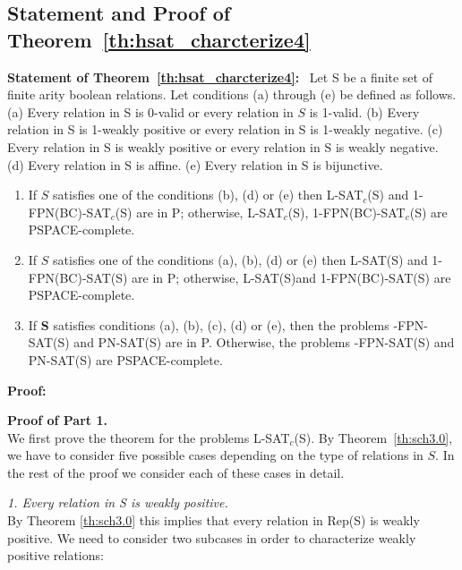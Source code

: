 \subsection{Statement and Proof of Theorem~\ref{th:hsat_charcterize4}}

\noindent
\textbf{Statement of Theorem~\ref{th:hsat_charcterize4}:}~
Let S be a finite set of finite arity boolean relations. Let conditions
(a) through (e) be defined as follows.
(a) Every relation in S is 0-valid or every relation in $S$ is 1-valid.
(b) Every relation in S is 1-weakly positive or
every relation in S is 1-weakly negative.
(c) Every relation in S is weakly positive or
every relation in S is weakly negative.
(d) Every relation in S is affine.
(e) Every relation in S is bijunctive.
\begin{enumerate}
\item
If $S$ satisfies one of the conditions (b), (d) or (e)
then L-SAT$_c$(S) and 1-FPN(BC)-SAT$_c$(S) are in P; otherwise,
L-SAT$_c$(S), 1-FPN(BC)-SAT$_c$(S) are  PSPACE-complete.

\item
If $S$ satisfies one of the conditions (a), (b), (d) or (e)
then L-SAT(S) and 1-FPN(BC)-SAT(S) are in P; otherwise, L-SAT(S)and 
1-FPN(BC)-SAT(S) are PSPACE-complete.

\item
If {\bf S} satisfies conditions (a), (b), (c), (d) or  (e), then the problems  
{-FPN-SAT(S)} and PN-SAT(S)  are in P. Otherwise, 
the problems  {-FPN-SAT(S)} and PN-SAT(S)  are  PSPACE-complete.
\end{enumerate}

\noindent
\textbf{Proof:} 

\noindent
{\bf Proof of Part 1.}\\
We first prove the theorem for the problems L-SAT$_c$(S).
By Theorem~\ref{th:sch3.0}, we have to consider five possible cases
depending on the type of relations in $S$. In the rest of the proof we
consider each of these cases in detail.

\noindent
{\em 1. Every relation in {\sf S} is weakly positive.}\\
By Theorem \ref{th:sch3.0} this implies that 
every relation in {\sf Rep(S)} is weakly positive. 
We need to consider two subcases in order to characterize weakly positive
relations:

